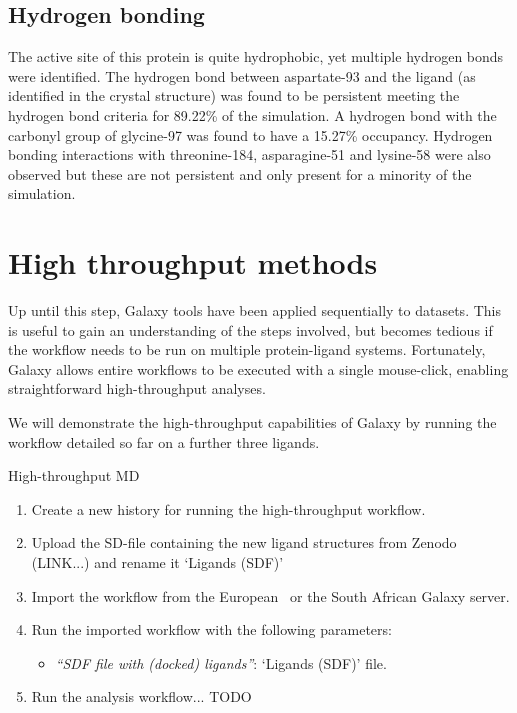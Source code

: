 \documentclass[twocolumn]{bmcart}%
\providecommand{\tightlist}{%
  \setlength{\itemsep}{0pt}\setlength{\parskip}{0pt}}
\begin{document}
\subsection*{Hydrogen bonding}
The active site of this protein is quite hydrophobic, yet multiple hydrogen bonds were identified. The hydrogen bond between aspartate-93 and the ligand (as identified in the crystal structure) was found to be persistent meeting the hydrogen bond criteria for 89.22\% of the simulation. A hydrogen bond with the carbonyl group of glycine-97 was found to have a 15.27\% occupancy. Hydrogen bonding interactions with threonine-184, asparagine-51 and lysine-58 were also observed but these are not persistent and only present for a minority of the simulation.

\hypertarget{optional-automating-high-throughput-calculations}{%
\section*{High throughput methods}\label{optional-automating-high-throughput-calculations}}

Up until this step, Galaxy tools have been applied sequentially to datasets. This is useful to gain an understanding of the steps involved, but becomes tedious if the workflow needs to be run on multiple protein-ligand systems. Fortunately, Galaxy allows entire workflows to be executed with a single mouse-click, enabling straightforward high-throughput analyses.

We will demonstrate the high-throughput capabilities of Galaxy by running the workflow detailed so far on a further three ligands.

\begin{handson_box_colour}{High-throughput MD}

\begin{enumerate}
\def\labelenumi{\arabic{enumi}.}
\tightlist
\item
  Create a new history for running the high-throughput workflow.

\item
  Upload the SD-file containing the new ligand structures from Zenodo (LINK...) and rename it `Ligands (SDF)'
\item
  Import the workflow from the European~\cite{eu_htmd_simulation_workflow} or the South African Galaxy server.
\item
  Run the imported workflow with the following parameters:

  \begin{itemize}
  \tightlist
  \item
    \emph{``SDF file with (docked) ligands''}: `Ligands (SDF)' file.
  \end{itemize}
\item
  Run the analysis workflow... TODO
\end{enumerate}
\end{handson_box_colour}
\end{document}
